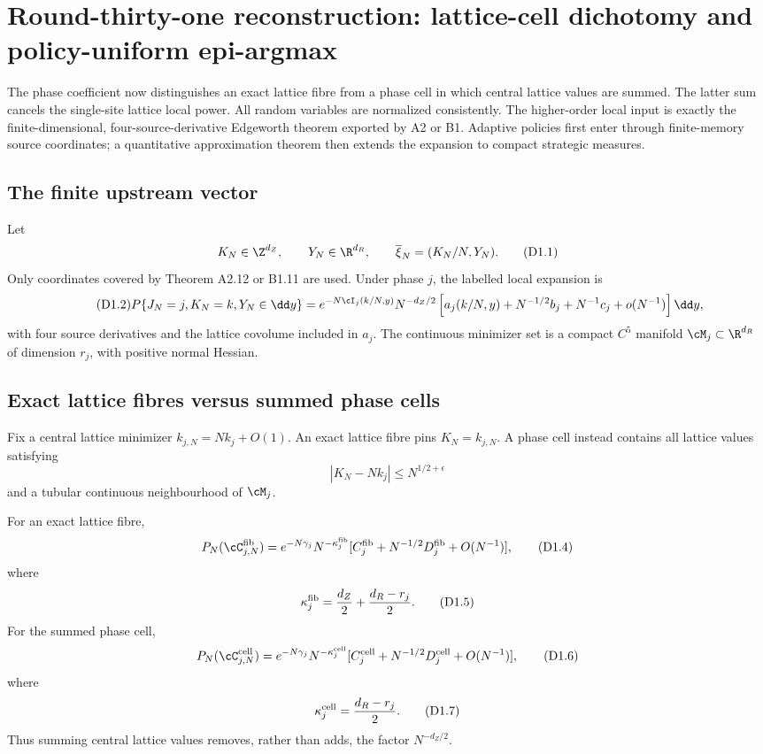 \section{Round-thirty-one reconstruction: lattice-cell dichotomy and policy-uniform epi-argmax}
\label{sec:r31-d1}

The phase coefficient now distinguishes an exact lattice fibre from a phase
cell in which central lattice values are summed.  The latter sum cancels the
single-site lattice local power.  All random variables are normalized
consistently.  The higher-order local input is exactly the finite-dimensional,
four-source-derivative Edgeworth theorem exported by A2 or B1.  Adaptive
policies first enter through finite-memory source coordinates; a quantitative
approximation theorem then extends the expansion to compact strategic
measures.

\subsection{The finite upstream vector}

Let
\[
 K_N\in\Z^{d_Z},\qquad Y_N\in\R^{d_R},\qquad
 \overline\xi_N=(K_N/N,Y_N).                              \tag{D1.1}
\]
Only coordinates covered by Theorem A2.12 or B1.11 are used.  Under phase
$j$, the labelled local expansion is
\begin{equation}\tag{D1.2}
 P\{J_N=j,K_N=k,Y_N\in\dd y\}
 =e^{-N\cI_j(k/N,y)}N^{-d_Z/2}
 \left[a_j(k/N,y)+N^{-1/2}b_j+N^{-1}c_j+o(N^{-1})\right]
 \dd y,
\end{equation}
with four source derivatives and the lattice covolume included in $a_j$.
The continuous minimizer set is a compact $C^5$ manifold
$\cM_j\subset\R^{d_R}$ of dimension $r_j$, with positive normal Hessian.

\subsection{Exact lattice fibres versus summed phase cells}

Fix a central lattice minimizer $k_{j,N}=Nk_j+O(1)$.  An exact lattice fibre
pins $K_N=k_{j,N}$.  A phase cell instead contains all lattice values satisfying
\[
 |K_N-Nk_j|\le N^{1/2+\epsilon}                           \tag{D1.3}
\]
and a tubular continuous neighbourhood of $\cM_j$.

\begin{theorem}
\label{thm:r31-d1-lattice-dichotomy}
For an exact lattice fibre,
\[
 P_N(\cC_{j,N}^{\rm fib})
 =e^{-N\gamma_j}N^{-\kappa_j^{\rm fib}}
 [C_j^{\rm fib}+N^{-1/2}D_j^{\rm fib}+O(N^{-1})],         \tag{D1.4}
\]
where
\[
 \kappa_j^{\rm fib}={d_Z\over2}+{d_R-r_j\over2}.          \tag{D1.5}
\]
For the summed phase cell,
\[
 P_N(\cC_{j,N}^{\rm cell})
 =e^{-N\gamma_j}N^{-\kappa_j^{\rm cell}}
 [C_j^{\rm cell}+N^{-1/2}D_j^{\rm cell}+O(N^{-1})],       \tag{D1.6}
\]
where
\[
 \kappa_j^{\rm cell}={d_R-r_j\over2}.                    \tag{D1.7}
\]
Thus summing central lattice values removes, rather than adds, the factor
$N^{-d_Z/2}$.
\end{theorem}

